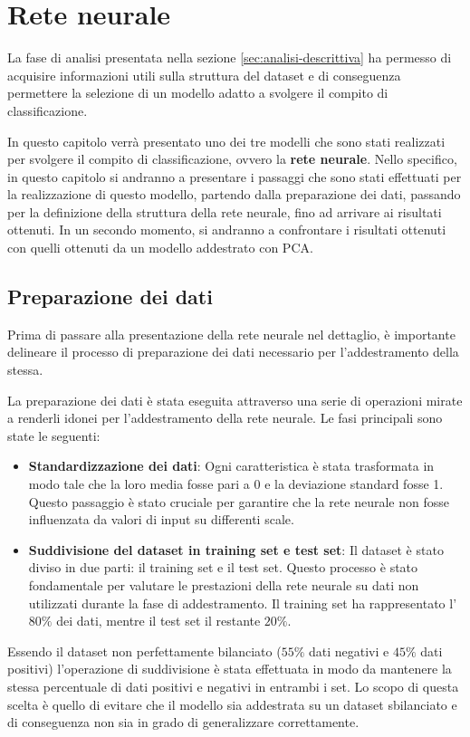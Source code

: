 \chapter{Rete neurale} \label{chp:reteNeurale}
La fase di analisi presentata nella sezione \ref{sec:analisi-descrittiva} ha
permesso di acquisire informazioni utili sulla struttura del dataset e di
conseguenza permettere la selezione di un modello adatto a svolgere il compito
di classificazione.

In questo capitolo verrà presentato uno dei tre modelli che sono stati realizzati
per svolgere il compito di classificazione, ovvero la \textbf{rete neurale}. Nello
specifico, in questo capitolo si andranno a presentare i passaggi che sono stati
effettuati per la realizzazione di questo modello, partendo dalla preparazione
dei dati, passando per la definizione della struttura della rete neurale, fino
ad arrivare ai risultati ottenuti. In un secondo momento, si andranno a
confrontare i risultati ottenuti con quelli ottenuti da un modello addestrato
con PCA.
\section{Preparazione dei dati}
Prima di passare alla presentazione della rete neurale nel dettaglio, è importante
delineare il processo di preparazione dei dati necessario per l'addestramento
della stessa.

La preparazione dei dati è stata eseguita attraverso una serie di operazioni
mirate a renderli idonei per l'addestramento della rete neurale. Le fasi
principali sono state le seguenti:
\begin{itemize}
    \item \textbf{Standardizzazione dei dati}: Ogni caratteristica è stata
          trasformata in modo tale che la loro media fosse pari a 0 e la
          deviazione standard fosse 1. Questo passaggio è stato cruciale per
          garantire che la rete neurale non fosse influenzata da valori di input
          su differenti scale.
    \item \textbf{Suddivisione del dataset in training set e test set}: Il
          dataset è stato diviso in due parti: il training set e il test set.
          Questo processo è stato fondamentale per valutare le prestazioni della
          rete neurale su dati non utilizzati durante la fase di addestramento.
          Il training set ha rappresentato l'$80\%$ dei dati, mentre il test
          set il restante $20\%$.
\end{itemize}
Essendo il dataset non perfettamente bilanciato ($55\%$ dati negativi e $45\%$
dati positivi) l'operazione di suddivisione è stata effettuata in modo da
mantenere la stessa percentuale di dati positivi e negativi in entrambi i set.
Lo scopo di questa scelta è quello di evitare che il modello sia addestrata su
un dataset sbilanciato e di conseguenza non sia in grado di generalizzare
correttamente.
